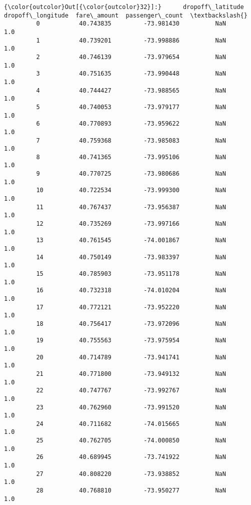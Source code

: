 \documentclass[11pt]{article}
\begin{document}
\begin{Verbatim}[commandchars=\\\{\}]
{\color{outcolor}Out[{\color{outcolor}32}]:}      dropoff\_latitude  dropoff\_longitude  fare\_amount  passenger\_count  \textbackslash{}
         0           40.743835         -73.981430          NaN              1.0   
         1           40.739201         -73.998886          NaN              1.0   
         2           40.746139         -73.979654          NaN              1.0   
         3           40.751635         -73.990448          NaN              1.0   
         4           40.744427         -73.988565          NaN              1.0   
         5           40.740053         -73.979177          NaN              1.0   
         6           40.770893         -73.959622          NaN              1.0   
         7           40.759368         -73.985083          NaN              1.0   
         8           40.741365         -73.995106          NaN              1.0   
         9           40.770725         -73.980686          NaN              1.0   
         10          40.722534         -73.999300          NaN              1.0   
         11          40.767437         -73.956387          NaN              1.0   
         12          40.735269         -73.997166          NaN              1.0   
         13          40.761545         -74.001867          NaN              1.0   
         14          40.750149         -73.983397          NaN              1.0   
         15          40.785903         -73.951178          NaN              1.0   
         16          40.732318         -74.010204          NaN              1.0   
         17          40.772121         -73.952220          NaN              1.0   
         18          40.756417         -73.972096          NaN              1.0   
         19          40.755563         -73.975954          NaN              1.0   
         20          40.714789         -73.941741          NaN              1.0   
         21          40.771800         -73.949132          NaN              1.0   
         22          40.747767         -73.992767          NaN              1.0   
         23          40.762960         -73.991520          NaN              1.0   
         24          40.711682         -74.015665          NaN              1.0   
         25          40.762705         -74.000850          NaN              1.0   
         26          40.689945         -73.741922          NaN              1.0   
         27          40.808220         -73.938852          NaN              1.0   
         28          40.768810         -73.950277          NaN              1.0   

\end{Verbatim}
\end{document}
